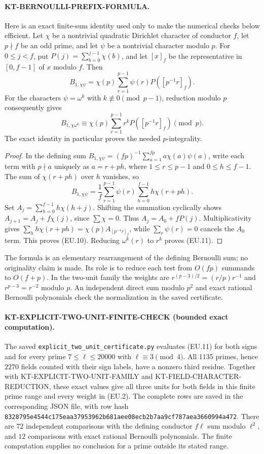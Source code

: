 \paragraph{KT-BERNOULLI-PREFIX-FORMULA.}
Here is an exact finite-sum identity used only to make the numerical
checks below efficient.  Let $\chi$ be a nontrivial quadratic Dirichlet
character of conductor $f$, let $p\nmid f$ be an odd prime, and let
$\psi$ be a nontrivial character modulo $p$.  For $0\leq j<f$, put
$P(j)=\sum_{b=0}^{j-1}\chi(b)$, and let $[x]_f$ be the representative
in $[0,f-1]$ of $x$ modulo $f$.  Then
\[
 B_{1,\chi\psi}
   =\chi(p)\sum_{r=1}^{p-1}\psi(r)P([p^{-1}r]_f).          \tag{EU.10}
\]
For the characters $\psi=\omega^k$ with
$k\not\equiv0\pmod{p-1}$, reduction modulo $p$ consequently gives
\[
 B_{1,\chi\omega^k}
 \equiv\chi(p)\sum_{r=1}^{p-1}r^kP([p^{-1}r]_f)\pmod p.  \tag{EU.11}
\]
The exact identity in particular proves the needed $p$-integrality.

\begin{proof}
In the defining sum
$B_{1,\chi\psi}=(fp)^{-1}\sum_{a=1}^{fp}a\chi(a)\psi(a)$,
write each term with $p\nmid a$ uniquely as $a=r+ph$, where
$1\leq r\leq p-1$ and $0\leq h\leq f-1$.  The sum of
$\chi(r+ph)$ over $h$ vanishes, so
\[
 B_{1,\chi\psi}=\frac1f\sum_{r=1}^{p-1}\psi(r)
                       \sum_{h=0}^{f-1}h\chi(r+ph).
\]
Set $A_j=\sum_{h=0}^{f-1}h\chi(h+j)$.  Shifting the summation
cyclically shows $A_{j+1}=A_j+f\chi(j)$, since $\sum\chi=0$.
Thus $A_j=A_0+fP(j)$.  Multiplicativity gives
$\sum_hh\chi(r+ph)=\chi(p)A_{[p^{-1}r]_f}$, while
$\sum_r\psi(r)=0$ cancels the $A_0$ term.  This proves (EU.10).
Reducing $\omega^k(r)$ to $r^k$ proves (EU.11).
\end{proof}

The formula is an elementary rearrangement of the defining Bernoulli
sum; no originality claim is made.  Its role is to reduce each test
from $O(fp)$ summands to $O(f+p)$.  In the two-unit family the weights
are $r^{(p-3)/2}=(r/p)r^{-1}$ and $r^{p-3}=r^{-2}$ modulo $p$.
An independent direct sum modulo $p^2$ and exact rational Bernoulli
polynomials check the normalization in the saved certificate.

\paragraph{KT-EXPLICIT-TWO-UNIT-FINITE-CHECK (bounded exact computation).}
The saved \texttt{explicit\_two\_unit\_certificate.py} evaluates
(EU.11) for both signs and for every prime
$7\leq\ell\leq20000$ with $\ell\equiv3\pmod4$.
All $1135$ primes, hence $2270$ fields counted with their sign labels,
have a nonzero third residue.  Together with
KT-EXPLICIT-TWO-UNIT-FAMILY and KT-FIELD-CHARACTER-REDUCTION, these
exact values give all three units for both fields in this finite
prime range and every weight in (EU.2).
The complete rows are saved in the corresponding JSON file, with
row hash
\texttt{8328795e4544c175eaa37953962b681aee08ecb2b7aa9cf787aea3660994a472}.
There are $72$ independent comparisons with the defining conductor
$f\ell$ sum modulo $\ell^2$, and $12$ comparisons with exact rational
Bernoulli polynomials.  The finite computation supplies no conclusion
for a prime outside its stated range.
